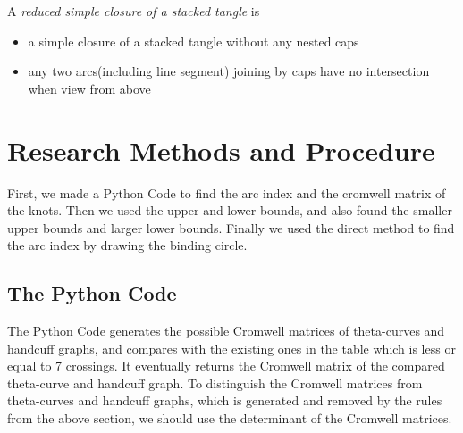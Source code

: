 \documentclass{article}
\theoremstyle{definition}
\newtheorem{defn}[thm]{Definition}
\theoremstyle{theorem}
\theoremstyle{proposition}
\theoremstyle{corollary}
\begin{document}
A \textit{reduced simple closure of a stacked tangle} is
\begin{itemize}
    \item a simple closure of a stacked tangle without any nested caps
    \item any two arcs(including line segment) joining by caps have no intersection when view from above
\end{itemize}




\section{Research Methods and Procedure}
First, we made a Python Code to find the arc index and the cromwell matrix of the knots. Then we used the upper and lower bounds, and also found the smaller upper bounds and larger lower bounds. Finally we used the direct method to find the arc index by drawing the binding circle.

\subsection{The Python Code}
The Python Code generates the possible Cromwell matrices of theta-curves and handcuff graphs, and compares with the existing ones in the table which is less or equal to 7 crossings.
It eventually returns the Cromwell matrix of the compared theta-curve and handcuff graph.
To distinguish the Cromwell matrices from theta-curves and handcuff graphs, which is generated and removed by the rules from the above section, we should use the determinant of the Cromwell matrices.\\
\end{document}
